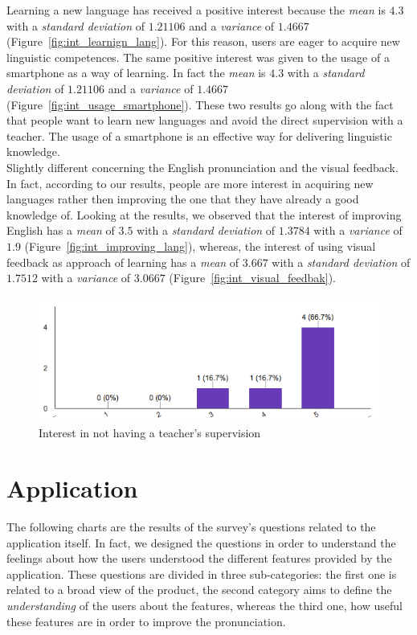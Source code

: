 \noindent Learning a new language has received a positive interest because the \textit{mean} is $4.3$ with a \textit{standard deviation} of $1.21106$ and a \textit{variance} of $1.4667$ (Figure~\ref{fig:int_learnign_lang}). For this reason, users are eager to acquire new linguistic competences. The same positive interest was given to the usage of a smartphone as a way of learning. In fact the \textit{mean} is $4.3$ with a \textit{standard deviation} of $1.21106$ and a \textit{variance} of $1.4667$ (Figure~\ref{fig:int_usage_smartphone}). These two results go along with the fact that people want to learn new languages and avoid the direct supervision with a teacher. The usage of a smartphone is an effective way for delivering linguistic knowledge. \\

\noindent Slightly different concerning the English pronunciation and the visual feedback. In fact, according to our results, people are more interest in acquiring new languages rather then improving the one that they have already a good knowledge of. Looking at the results, we observed that the interest of improving English has a \textit{mean} of $3.5$ with a \textit{standard deviation} of $1.3784$ with a \textit{variance} of $1.9$ (Figure~\ref{fig:int_improving_lang}), whereas, the interest of using visual feedback as approach of learning has a \textit{mean} of $3.667$ with a \textit{standard deviation} of $1.7512$ with a \textit{variance} of $3.0667$ (Figure~\ref{fig:int_visual_feedbak}).

\begin{figure}[!ht]
	\centering
	\includegraphics[scale=0.4]{Figures/responses/interest_no_teacher.png}
	\caption{Interest in not having a teacher's supervision}
	\label{fig:int_no_teacher}
\end{figure}

\section{Application}
\label{sub:Application}
\noindent The following charts are the results of the survey's questions related to the application itself. In fact, we designed the questions in order to understand the feelings about how the users understood the different features provided by the application. These questions are divided in three sub-categories: the first one is related to a broad view of the product, the second category aims to define the \textit{understanding} of the users about the features, whereas the third one, how useful these features are in order to improve the pronunciation. \\

